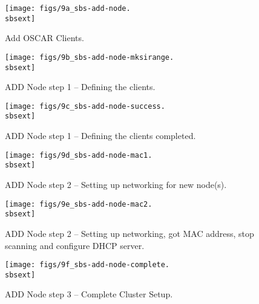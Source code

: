 
\begin{figure}[htbp]
  \begin{center}
    \texttt{[image: figs/9a\_sbs-add-node.\\sbsext]}
    \caption{Add OSCAR Clients.}
    \label{fig:sbs-add-node1}
  \end{center}
\end{figure}


\begin{figure}[htbp]
  \begin{center}
    \texttt{[image: figs/9b\_sbs-add-node-mksirange.\\sbsext]}
    \caption{ADD Node step 1 -- Defining the clients.}
    \label{fig:sbs-add-node1-define-clients}
  \end{center}
\end{figure}

\begin{figure}[htbp]
  \begin{center}
    \texttt{[image: figs/9c\_sbs-add-node-success.\\sbsext]}
    \caption{ADD Node step 1 -- Defining the clients completed.}
    \label{fig:sbs-add-node1-define-clients2}
  \end{center}
\end{figure}


\begin{figure}[htbp]
  \begin{center}
    \texttt{[image: figs/9d\_sbs-add-node-mac1.\\sbsext]}
    \caption{ADD Node step 2 -- Setting up networking for new node(s).}
    \label{fig:sbs-add-node1-setup-network}
  \end{center}
\end{figure}

%
\begin{figure}[htbp]
  \begin{center}
    \texttt{[image: figs/9e\_sbs-add-node-mac2.\\sbsext]}
    \caption{ADD Node step 2 -- Setting up networking, got MAC address, stop scanning and configure DHCP server.}
    \label{fig:sbs-add-node1-setup-network2}
  \end{center}
\end{figure}

\clearpage

\begin{figure}[htbp]
  \begin{center}
    \texttt{[image: figs/9f\_sbs-add-node-complete.\\sbsext]}
    \caption{ADD Node step 3 -- Complete Cluster Setup.}
    \label{fig:sbs-add-node1-cluster-setup}
  \end{center}
\end{figure}

